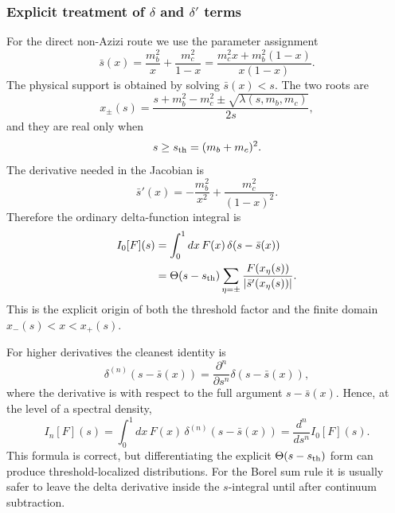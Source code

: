 \documentclass[11pt]{article}
\begin{document}
\subsubsection{Explicit treatment of \texorpdfstring{\(\delta\)}{delta} and
\texorpdfstring{\(\delta'\)}{delta-prime} terms}

For the direct non-Azizi route we use the parameter assignment
\begin{equation}
  \bar s(x)
  =
  \frac{m_b^2}{x}
  +
  \frac{m_c^2}{1-x}
  =
  \frac{m_c^2x+m_b^2(1-x)}{x(1-x)}.
\end{equation}
The physical support is obtained by solving
\(\bar s(x)<s\).  The two roots are
\begin{equation}
  x_\pm(s)
  =
  \frac{s+m_b^2-m_c^2
  \pm\sqrt{\lambda(s,m_b,m_c)}}{2s},
\end{equation}
and they are real only when
\begin{equation}
  s\geq s_{\rm th}=(m_b+m_c)^2.
\end{equation}
The derivative needed in the Jacobian is
\begin{equation}
  \bar s'(x)
  =
  -\frac{m_b^2}{x^2}
  +
  \frac{m_c^2}{(1-x)^2}.
\end{equation}
Therefore the ordinary delta-function integral is
\begin{align}
  I_0[F](s)
  &=
  \int_0^1dx\,F(x)\,
  \delta\!\left(s-\bar s(x)\right)
  \nonumber\\
  &=
  \Theta(s-s_{\rm th})
  \sum_{\eta=\pm}
  \frac{F(x_\eta(s))}
       {|\bar s'(x_\eta(s))|}.
\end{align}
This is the explicit origin of both the threshold factor and the finite
domain \(x_-(s)<x<x_+(s)\).

For higher derivatives the cleanest identity is
\begin{equation}
  \delta^{(n)}\!\left(s-\bar s(x)\right)
  =
  \frac{\partial^n}{\partial s^n}
  \delta\!\left(s-\bar s(x)\right),
\end{equation}
where the derivative is with respect to the full argument \(s-\bar s(x)\).
Hence, at the level of a spectral density,
\begin{equation}
  I_n[F](s)
  =
  \int_0^1dx\,F(x)\,
  \delta^{(n)}\!\left(s-\bar s(x)\right)
  =
  \frac{d^n}{ds^n}I_0[F](s).
\end{equation}
This formula is correct, but differentiating the explicit
\(\Theta(s-s_{\rm th})\) form can produce threshold-localized distributions.
For the Borel sum rule it is usually safer to leave the delta derivative
inside the \(s\)-integral until after continuum subtraction.
\end{document}
